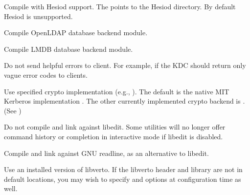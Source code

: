\documentclass[letterpaper,10pt,english]{sphinxmanual}
\begin{document}
\begin{description}
\sphinxAtStartPar
Compile with Hesiod support.  The  points to the Hesiod
directory.  By default Hesiod is unsupported.

\sphinxAtStartPar
Compile OpenLDAP database backend module.

\sphinxAtStartPar
Compile LMDB database backend module.

\sphinxAtStartPar
Do not send helpful errors to client.  For example, if the KDC
should return only vague error codes to clients.

\sphinxAtStartPar
Use specified crypto implementation (e.g., \sphinxstylestrong{\sphinxhyphen{}}).  The default is the native MIT
Kerberos implementation .  The other currently
implemented crypto backend is .  (See
)

\sphinxAtStartPar
Do not compile and link against libedit.  Some utilities will no
longer offer command history or completion in interactive mode if
libedit is disabled.

\sphinxAtStartPar
Compile and link against GNU readline, as an alternative to libedit.

\sphinxAtStartPar
Use an installed version of libverto.  If the libverto header and
library are not in default locations, you may wish to specify
 and  options
at configuration time as well.


\end{description}
\end{document}
